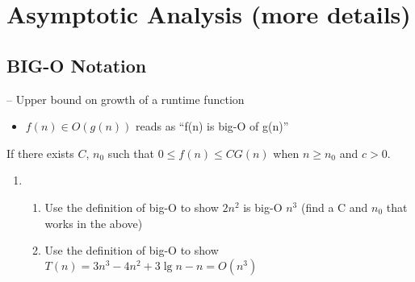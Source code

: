 \documentclass[12pt]{report}
\begin{document}
\section{Asymptotic Analysis (more details)}\label{sec:asymptotic-analysis-(more-details)}
\subsection{BIG-O Notation} -- Upper bound on growth of a runtime function
\begin{itemize}
	\item $f(n)\in O(g(n))$ reads as ``f(n) is big-O of g(n)''
\end{itemize}
If there exists $C$, $n_{0}$ such that $0 \leq f(n) \leq CG(n)$ when $n \geq n_{0}$ and $c>0$.	%

\begin{enumerate}[label=]
	\item
    \begin{enumerate}[label=\arabic{enumi}\alph*.]
        \item Use the definition of big-O to show $2n^{2}$ is big-O $n^{3}$ (find a C and $n_{0}$ that works in the above) 
		\item Use the definition of big-O to show $T(n)=3n^{3}-4n^{2}+3\lg n-n=O(n^3)$ 
    \end{enumerate}
\end{enumerate}
\end{document}
